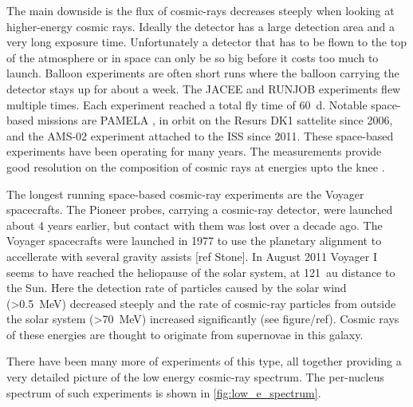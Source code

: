 The main downside is the flux of cosmic-rays decreases steeply when looking at higher-energy cosmic rays. Ideally the detector has a large detection area and a very long exposure time. Unfortunately a detector that has to be flown to the top of the atmosphere or in space can only be so big before it costs too much to launch. Balloon experiments are often short runs where the balloon carrying the detector stays up for about a week. The JACEE \cite{asakimori1998jacee} and RUNJOB \cite{hareyama2011runjob} experiments flew multiple times. Each experiment reached a total fly time of \SI{60}{\day}. Notable space-based missions are PAMELA \cite{adriani2014pamela}, in orbit on the Resurs DK1 sattelite since 2006, and the AMS-02 \cite{casaus2014ams} experiment attached to the ISS since 2011. These space-based experiments have been operating for many years. The measurements provide good resolution on the composition of cosmic rays at energies upto the knee \cite{kulikov1958knee}.

The longest running space-based cosmic-ray experiments are the Voyager spacecrafts. The Pioneer probes, carrying a cosmic-ray detector, were launched about 4 years earlier, but contact with them was lost over a decade ago. The Voyager spacecrafts were launched in 1977 to use the planetary alignment to accellerate with several gravity assists [ref Stone]. In August 2011 Voyager I seems to have reached the heliopause of the solar system, at \SI{121}{\astronomicalunit} distance to the Sun. Here the detection rate of particles caused by the solar wind (>\SI{0.5}{\MeV}) decreased steeply and the rate of cosmic-ray particles from outside the solar system (>\SI{70}{\MeV}) increased significantly (see figure/ref). Cosmic rays of these energies are thought to originate from supernovae in this galaxy.

There have been many more of experiments of this type, all together providing a very detailed picture of the low energy cosmic-ray spectrum. The per-nucleus spectrum of such experiments is shown in \cref{fig:low_e_spectrum}.

